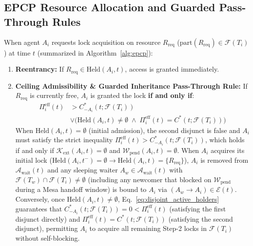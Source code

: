 \documentclass[conference,10pt]{IEEEtran}
\begin{document}
\subsection{EPCP Resource Allocation and Guarded Pass-Through Rules}
When agent $A_i$ requests lock acquisition on resource $R_{\text{req}}$ ($\text{part}(R_{\text{req}}) \in \mathcal{F}(T_i)$) at time $t$ (summarized in Algorithm~\ref{alg:epcp}):
\begin{enumerate}
    \item \textbf{Reentrancy:} If $R_{\text{req}} \in \text{Held}(A_i, t)$, access is granted immediately.
    \item \textbf{Ceiling Admissibility \& Guarded Inheritance Pass-Through Rule:} If $R_{\text{req}}$ is currently free, $A_i$ is granted the lock \textbf{if and only if}:
    \begin{equation}
    \label{eq:ceiling_rule}
    \begin{aligned}
    \Pi_i^{\text{eff}}(t) &> C_{-A_i}^*(t; \mathcal{F}(T_i)) \\
    &\lor \Big( \text{Held}(A_i, t) \ne \emptyset \;\land\; \Pi_i^{\text{eff}}(t) = C^*(t; \mathcal{F}(T_i)) \Big)
    \end{aligned}
    \end{equation}
    When $\text{Held}(A_i, t) = \emptyset$ (initial admission), the second disjunct is false and $A_i$ must satisfy the strict inequality $\Pi_i^{\text{eff}}(t) > C_{-A_i}^*(t; \mathcal{F}(T_i))$, which holds if and only if $\mathcal{K}_{\text{ext}}(A_i, t) = \emptyset$ and $\mathcal{W}_{\text{pend}}(A_i, t) = \emptyset$. When $A_i$ acquires its initial lock ($\text{Held}(A_i, t^-) = \emptyset \to \text{Held}(A_i, t) = \{R_{\text{req}}\}$), $A_i$ is removed from $\mathcal{A}_{\text{wait}}(t)$ and any sleeping waiter $A_w \in \mathcal{A}_{\text{wait}}(t)$ with $\mathcal{F}(T_w) \cap \mathcal{F}(T_i) \ne \emptyset$ (including any newcomer that blocked on $\mathcal{W}_{\text{pend}}$ during a Mesa handoff window) is bound to $A_i$ via $(A_w \to A_i) \in \mathcal{E}(t)$. Conversely, once $\text{Held}(A_i, t) \ne \emptyset$, Eq.~\eqref{eq:disjoint_active_holders} guarantees that $C_{-A_i}^*(t; \mathcal{F}(T_i)) = 0 < \Pi_i^{\text{eff}}(t)$ (satisfying the first disjunct directly) and $\Pi_i^{\text{eff}}(t) = C^*(t; \mathcal{F}(T_i))$ (satisfying the second disjunct), permitting $A_i$ to acquire all remaining Step-2 locks in $\mathcal{F}(T_i)$ without self-blocking.

\end{enumerate}
\end{document}
